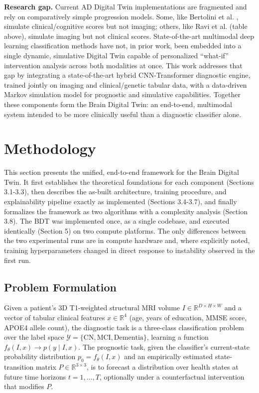 \documentclass[pdflatex,sn-mathphys-num]{sn-jnl}%
\theoremstyle{thmstyleone}%
\theoremstyle{thmstyletwo}%
\theoremstyle{thmstylethree}%
\begin{document}
\textbf{Research gap.} Current AD Digital Twin implementations are fragmented and rely on comparatively simple progression models. Some, like Bertolini et al. \cite{bib10}, simulate clinical/cognitive scores but not imaging; others, like Ravi et al. \cite{bib29} (table above), simulate imaging but not clinical scores. State-of-the-art multimodal deep learning classification methods have not, in prior work, been embedded into a single dynamic, simulative Digital Twin capable of personalized ``what-if'' intervention analysis across both modalities at once. This work addresses that gap by integrating a state-of-the-art hybrid CNN-Transformer diagnostic engine, trained jointly on imaging and clinical/genetic tabular data, with a data-driven Markov simulation model for prognostic and simulative capabilities. Together these components form the Brain Digital Twin: an end-to-end, multimodal system intended to be more clinically useful than a diagnostic classifier alone.


\FloatBarrier
\section{Methodology}\label{sec3}

This section presents the unified, end-to-end framework for the Brain Digital Twin. It first establishes the theoretical foundations for each component (Sections 3.1-3.3), then describes the as-built architecture, training procedure, and explainability pipeline exactly as implemented (Sections 3.4-3.7), and finally formalizes the framework as two algorithms with a complexity analysis (Section 3.8). The BDT was implemented once, as a single codebase, and executed identically (Section 5) on two compute platforms. The only differences between the two experimental runs are in compute hardware and, where explicitly noted, training hyperparameters changed in direct response to instability observed in the first run.

\subsection{Problem Formulation}\label{sec3_1}

Given a patient's 3D T1-weighted structural MRI volume $I \in \mathbb{R}^{D \times H \times W}$ and a vector of tabular clinical features $x \in \mathbb{R}^{4}$ (age, years of education, MMSE score, APOE4 allele count), the diagnostic task is a three-class classification problem over the label space $\mathcal{Y} = \{\text{CN}, \text{MCI}, \text{Dementia}\}$, learning a function $f_\theta(I, x) \rightarrow p(y \mid I, x)$. The prognostic task, given the classifier's current-state probability distribution $p_0 = f_\theta(I, x)$ and an empirically estimated state-transition matrix $P \in \mathbb{R}^{3 \times 3}$, is to forecast a distribution over health states at future time horizons $t = 1, \ldots, T$, optionally under a counterfactual intervention that modifies $P$.
\end{document}
